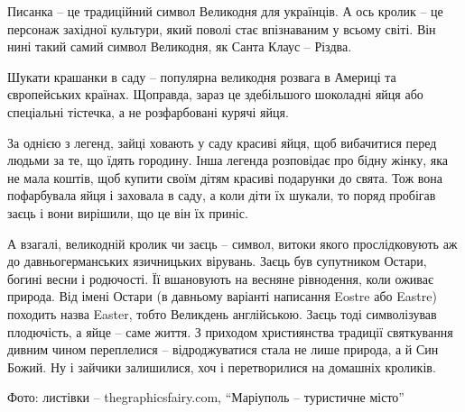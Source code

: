 
Писанка – це традиційний символ Великодня для українців. А ось кролик – це
персонаж західної культури, який поволі стає впізнаваним у всьому світі. Він
нині такий самий символ Великодня, як Санта Клаус – Різдва.

Шукати крашанки в саду – популярна великодня розвага в Америці та європейських
країнах. Щоправда, зараз це здебільшого шоколадні яйця або спеціальні тістечка,
а не розфарбовані курячі яйця.


За однією з легенд, зайці ховають у саду красиві яйця, щоб вибачитися перед
людьми за те, що їдять городину. Інша легенда розповідає про бідну жінку, яка
не мала коштів, щоб купити своїм дітям красиві подарунки до свята. Тож вона
пофарбувала яйця і заховала в саду, а коли діти їх шукали, то поряд пробігав
заєць і вони вирішили, що це він їх приніс.


А взагалі, великодній кролик чи заєць – символ, витоки якого прослідковують аж
до давньогерманських язичницьких вірувань. Заєць був супутником Остари, богині
весни і родючості. Її вшановують на весняне рівнодення, коли оживає природа.
Від імені Остари (в давньому варіанті написання Eostre або Eastre) походить
назва Easter, тобто Великдень англійською. Заєць тоді символізував плодючість,
а яйце – саме життя. З приходом християнства традиції святкування дивним чином
переплелися – відроджуватися стала не лише природа, а й Син Божий. Ну і зайчики
залишилися, хоч і перетворилися на домашніх кроликів.

Фото: листівки – thegraphicsfairy.com, \enquote{Маріуполь – туристичне місто}

